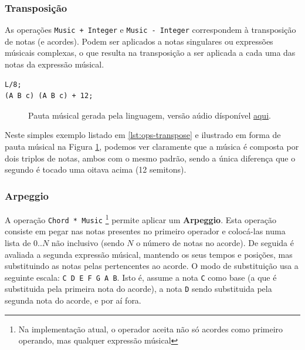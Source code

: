 \subsubsection{Transposição}
As operações \verb|Music + Integer| e \verb|Music - Integer| correspondem à transposição de notas (e acordes). Podem ser aplicados a notas singulares ou expressões músicais complexas, o que resulta na transposição a ser aplicada a cada uma das notas da expressão músical.

\begin{lstlisting}[caption={Exemplo de transposição de um acompanhamento com três notas},label=lst:ops-transpose,belowcaptionskip=-\medskipamount]
L/8;
(A B c) (A B c) + 12;
\end{lstlisting}

\begin{figure}[ht]
  \centering
  {%
  \setlength{\fboxsep}{0pt}%
  \setlength{\fboxrule}{0pt}%
  }%
  \caption{Pauta músical gerada pela linguagem, versão aúdio dísponível \href{https://drive.google.com/file/d/1xVey6on6Q-sWjNgo__Llb3QgOF1-_axa}{\underline{aqui}}\protect\footnotemark.}
  \label{fig:ops-transpose}
\end{figure}

Neste simples exemplo listado em \ref{lst:ops-transpose} e ilustrado em forma de pauta músical na Figura \ref{fig:ops-transpose}, podemos ver claramente que a música é composta por dois triplos de notas, ambos com o mesmo padrão, sendo a única diferença que o segundo é tocado uma oitava acima (12 semitons).

\subsubsection{Arpeggio}
A operação \verb|Chord * Music| \footnote{Na implementação atual, o operador aceita não só acordes como primeiro operando, mas qualquer expressão músical} permite aplicar um \textbf{Arpeggio}. Esta operação consiste em pegar nas notas presentes no primeiro operador e colocá-las numa lista de $0 .. N$ não inclusivo (sendo $N$ o número de notas no acorde). De seguida é avaliada a segunda expressão músical, mantendo os seus tempos e posições, mas substituindo as notas pelas pertencentes ao acorde. O modo de substituição usa a seguinte escala: \texttt{C D E F G A B}. Isto é, assume a nota \texttt{C} como base (a que é substituida pela primeira nota do acorde), a nota \texttt{D} sendo substituida pela segunda nota do acorde, e por aí fora.

